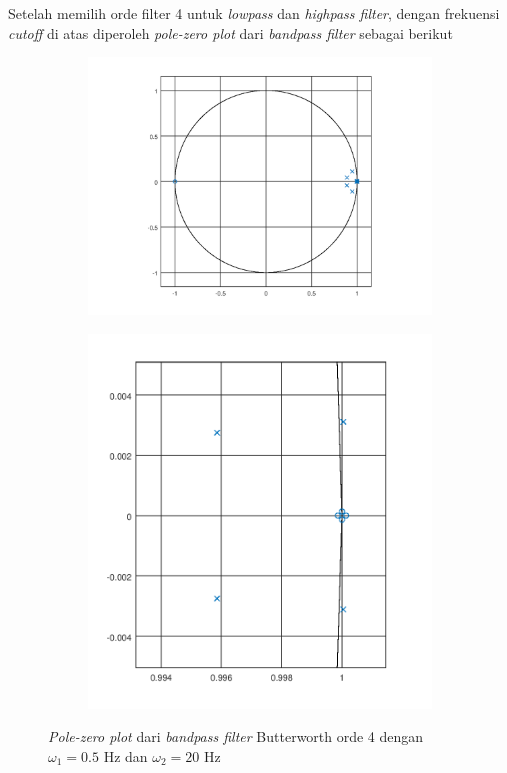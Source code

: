\documentclass[11pt]{article}
\begin{document}
Setelah memilih orde filter 4 untuk \textit{lowpass} dan \textit{highpass filter}, dengan frekuensi \textit{cutoff} di atas diperoleh \textit{pole-zero plot} dari \textit{bandpass filter} sebagai berikut

\begin{figure}[H]
\begin{subfigure}
    \centering
    \includegraphics[scale=0.5]{figures/fig11-bpfpzp.png}
\end{subfigure}
\begin{subfigure}
    \centering
    \includegraphics[scale=0.25]{figures/fig12-bpfpzp2.png}
\end{subfigure}
\caption{\textit{Pole-zero plot} dari \textit{bandpass filter} Butterworth orde 4 dengan $\omega_1 = 0.5$ Hz dan $\omega_2 = 20$ Hz}
\end{figure}
\end{document}
